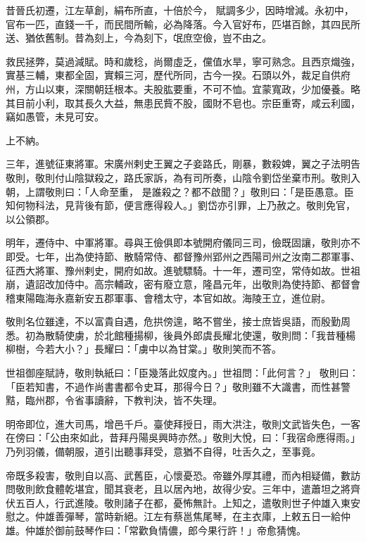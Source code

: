 \begin{pinyinscope}
 昔晉氏初遷，江左草創，絹布所直，十倍於今，
 賦調多少，因時增減。永初中，官布一匹，直錢一千，而民間所輸，必為降落。今入官好布，匹堪百餘，其四民所送、猶依舊制。昔為刻上，今為刻下，氓庶空儉，豈不由之。



 救民拯弊，莫過減賦。時和歲稔，尚爾虛乏，儻值水旱，寧可熟念。且西京熾強，實基三輔，東都全固，實賴三河，歷代所同，古今一揆。石頭以外，裁足自供府州，方山以東，深關朝廷根本。夫股肱要重，不可不恤。宜蒙寬政，少加優養。略其目前小利，取其長久大益，無患民貲不股，國財不皂也。宗臣重寄，咸云利國，竊如愚管，未見可安。



 上不納。



 三年，進號征東將軍。宋廣州剌史王翼之子妾路氏，剛暴，數殺婢，翼之子法明告敬則，敬則付山陰獄殺之，路氏家訴，為有司所奏，山陰令劉岱坐棄市刑。敬則入朝，上謂敬則曰：「人命至重，
 是誰殺之？都不啟聞？」敬則曰：「是臣愚意。臣知何物科法，見背後有節，便言應得殺人。」劉岱亦引罪，上乃赦之。敬則免官，以公領郡。



 明年，遷侍中、中軍將軍。尋與王儉俱即本號開府儀同三司，儉既固讓，敬則亦不即受。七年，出為使持節、散騎常侍、都督豫州郢州之西陽司州之汝南二郡軍事、征西大將軍、豫州剌史，開府如故。進號驃騎。十一年，遷司空，常侍如故。世祖崩，遺詔改加侍中。高宗輔政，密有廢立意，隆昌元年，出敬則為使持節、都督會稽東陽臨海永嘉新安五郡軍事、會稽太守，本官如故。海陵王立，進位尉。



 敬則名位雖達，不以富貴自遇，危拱傍遑，略不嘗坐，接士庶皆吳語，而殷勤周悉。初為散騎使虜，於北館種揚柳，後員外郎虞長耀北使還，敬則問：「我昔種楊柳樹，今若大小？」長耀曰：「虜中以為甘棠。」敬則笑而不答。



 世祖御座賦詩，敬則執紙曰：「臣幾落此奴度內。」世祖問：「此何言？」
 敬則曰：「臣若知書，不過作尚書書都令史耳，那得今日？」敬則雖不大識書，而性甚警黠，臨州郡，令省事讀辭，下教判決，皆不失理。



 明帝即位，進大司馬，增邑千戶。臺使拜授日，雨大洪注，敬則文武皆失色，一客在傍曰：「公由來如此，昔拜丹陽吳興時亦然。」敬則大悅，曰：「我宿命應得雨。」乃列羽儀，備朝服，道引出聽事拜受，意猶不自得，吐舌久之，至事竟。



 帝既多殺害，敬則自以高、武舊臣，心懷憂恐。帝雖外厚其禮，而內相疑備，數訪問敬則飲食體乾堪宜，聞其衰老，且以居內地，故得少安。三年中，遣蕭坦之將齊伏五百人，行武進陵。敬則諸子在都，憂怖無計。上知之，遣敬則世子仲雄入東安慰之。仲雄善彈琴，當時新絕。江左有蔡邕焦尾琴，在主衣庫，上敕五日一給仲雄。仲雄於御前鼓琴作曰：「常歡負情儂，郎今果行許！」帝愈猜愧。




\end{pinyinscope}
